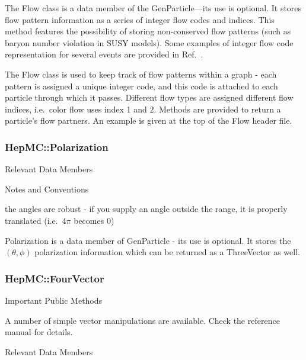 \documentclass[11pt,letterpaper]{article}
\begin{document}
The Flow class is a data member of the GenParticle---its use is
optional.  It stores flow
pattern information as a series of integer flow codes and indices.
This method features the possibility
of storing non-conserved flow patterns (such as baryon number
violation in SUSY models).
Some examples of integer flow code representation for several events
are provided in Ref.~\cite{Boos:2001cv}.

The Flow class is used to keep track of flow patterns within a graph -
each pattern is assigned a unique integer code, and this code is
attached to each particle through which it passes. Different flow
types are assigned different flow indices, i.e.\ color flow uses index
1 and 2. Methods are provided to return a particle's flow partners. An
example is given at the top of the Flow header file.

%
%

\subsubsection{HepMC::Polarization}
\begin{myitemize}{Relevant Data Members}
\end{myitemize}
\begin{myitemize}{Notes and Conventions}
  \item the angles are robust - if you supply an angle outside the
    range, it is properly translated (i.e.\ $4\pi$ becomes 0)
\end{myitemize}

Polarization is a data member of GenParticle - its use is
optional. It stores the $(\theta,\phi)$ polarization information which
can be returned as a ThreeVector as well.

%
%

\subsubsection{HepMC::FourVector}
\begin{myitemize}{Important Public Methods}
  \item A number of simple vector manipulations are available.
          Check the reference manual for details.
\end{myitemize}
\begin{myitemize}{Relevant Data Members}
\end{myitemize}
\end{document}
